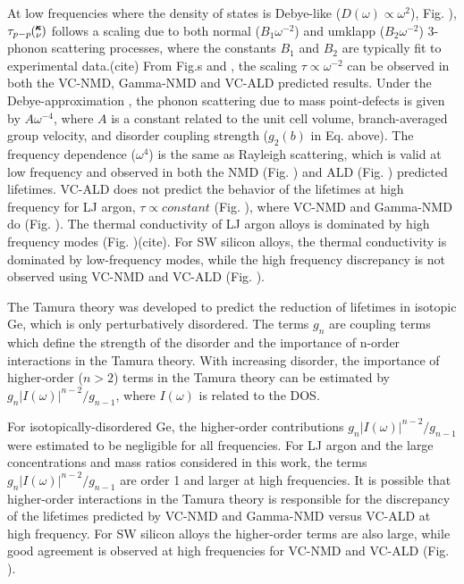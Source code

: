\documentclass[aps,prb,twocolumn,superscriptaddress,amsmath,amssymb,floatfix]{revtex4}
\newcommand{\kv}{\mspace{-4.0mu}\left(\mspace{-8.0mu}
\begin{smallmatrix}&\pmb{\kappa} \\&\nu\end{smallmatrix}
\mspace{-3.0mu}\right)}
\begin{document}
At low frequencies where the density of states is Debye-like 
($D(\omega) \propto \omega^{2}$), Fig. ), 
$\tau_{p-p}\kv$ follows a scaling due to both normal ($B_1\omega^{-2}$) 
and umklapp ($B_2\omega^{-2}$) 3-phonon scattering processes, where the 
constants $B_1$ and $B_2$ are typically fit to experimental data.(cite) 
From Fig.s and , the scaling $\tau \propto \omega^{-2}$ can be observed  
in both the VC-NMD, Gamma-NMD and VC-ALD predicted results. 
Under the Debye-approximation , 
the phonon scattering due to mass point-defects 
is given by $A\omega^{-4}$, where $A$ is a constant related to the unit 
cell volume, branch-averaged group velocity, and disorder coupling strength 
($g_2(b)$ in Eq. above). 
The frequency dependence ($\omega^4$) is the same as 
Rayleigh scattering, which is valid at low frequency and observed 
in both the NMD (Fig. ) and ALD (Fig. ) predicted lifetimes. 
VC-ALD does not predict the behavior of the lifetimes at high frequency 
for LJ argon, $\tau \propto constant$ (Fig. ), 
where VC-NMD and Gamma-NMD do (Fig. ). The thermal conductivity of 
LJ argon alloys is dominated by high frequency modes (Fig. )(cite). 
For SW silicon alloys, the thermal conductivity is dominated by 
low-frequency modes, while the high frequency discrepancy is 
not observed using VC-NMD and VC-ALD (Fig. ). 

The Tamura theory was developed to predict the reduction of lifetimes 
in isotopic Ge, which is only perturbatively disordered. 
The terms $g_n$ are  
coupling terms which define the strength of the disorder and the 
importance of n-order interactions in the Tamura theory.  
With increasing disorder, 
the importance of higher-order ($n > 2$) terms in the 
Tamura theory can be estimated by $g_n|I(\omega)|^{n-2}/g_{n-1}$, 
where $I(\omega)$ is related to the DOS.\cite{tamura_isotope_1983} 

For isotopically-disordered Ge, the higher-order contributions 
$g_n|I(\omega)|^{n-2}/g_{n-1}$ were estimated to be negligible for all 
frequencies.\cite{tamura_isotope_1983} 
For LJ argon and the large concentrations and mass ratios considered 
in this work, the terms 
$g_n|I(\omega)|^{n-2}/g_{n-1}$ are order 1 and larger at high 
frequencies. It is possible that 
higher-order interactions in the Tamura theory 
is responsible for the 
discrepancy of the lifetimes predicted by VC-NMD and Gamma-NMD 
versus VC-ALD at high frequency.
For SW silicon alloys the higher-order terms are also large, while 
good agreement is observed at high frequencies for VC-NMD and VC-ALD 
(Fig. ).
\end{document}
